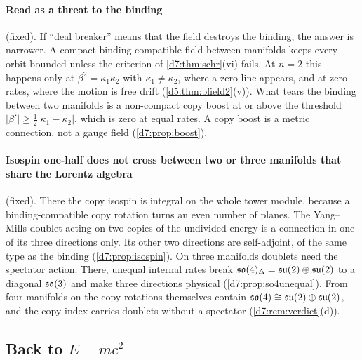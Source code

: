 \paragraph{Read as a threat to the binding} (fixed). If ``deal breaker'' means that the field destroys the binding, the answer is narrower. A
compact binding-compatible field between manifolds keeps every orbit bounded unless the criterion of \cref{d7:thm:schr}(vi) fails. At $n=2$ this
happens only at $\beta^2=\kappa_1\kappa_2$ with $\kappa_1\neq\kappa_2$, where a zero line appears, and at zero rates, where the motion is free drift
(\cref{d5:thm:bfield2}(v)). What tears the binding between two manifolds is a non-compact copy boost at or above the threshold
$|\beta'|\ge\tfrac12|\kappa_1-\kappa_2|$, which is zero at equal rates. A copy boost is a metric connection, not a gauge field (\cref{d7:prop:boost}).

\paragraph{Isospin one-half does not cross between two or three manifolds that share the Lorentz algebra} (fixed). There the copy isospin is
integral on the whole tower module, because a binding-compatible copy rotation turns an even number of planes. The Yang--Mills doublet acting on two copies of the
undivided energy is a connection in one of its three directions only. Its other two directions are self-adjoint, of the same type as the
binding (\cref{d7:prop:isospin}). On three manifolds doublets need the spectator action. There, unequal internal rates break $\mathfrak{so}(4)_\Delta=\mathfrak{su}(2)\oplus\mathfrak{su}(2)$ to a
diagonal $\mathfrak{so}(3)$ and make three directions physical (\cref{d7:prop:so4unequal}). From four manifolds on the copy rotations themselves contain
$\mathfrak{so}(4)\cong\mathfrak{su}(2)\oplus\mathfrak{su}(2)$, and the copy index carries doublets without a spectator (\cref{d7:rem:verdict}(d)).

\subsection{\texorpdfstring{Back to $E=mc^2$}{Back to E = mc2}}

